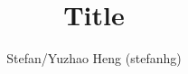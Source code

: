 \documentclass{article}
\title{Title}
\author{Stefan/Yuzhao Heng (stefanhg)}
\begin{document}
\normalsize
\maketitle





\section{}
\end{document}
